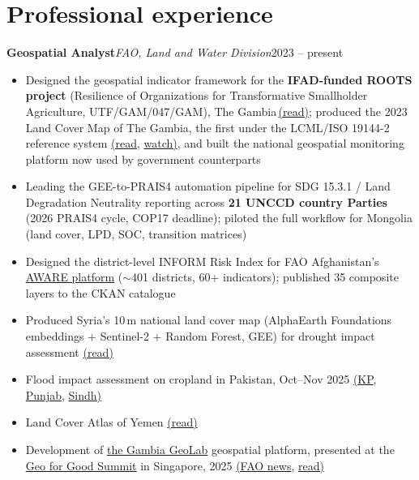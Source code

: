 \documentclass[10pt,a4paper]{article}
\newcommand{\role}[3]{%
  \textbf{#1}\hfill\textcolor{accent}{\textit{#2}}\hfill{#3}\par\vspace{0.15em}}
\begin{document}
\section{Professional experience}

\role{Geospatial Analyst}{FAO, Land and Water Division}{2023 -- present}
\begin{itemize}
\item Designed the geospatial indicator framework for the \textbf{IFAD-funded ROOTS project} (Resilience of Organizations for Transformative Smallholder Agriculture, UTF/GAM/047/GAM), The Gambia\,\href{https://openknowledge.fao.org/items/f3175f42-56ff-4b85-892b-528dd124b73a}{(read)}; produced the 2023 Land Cover Map of The Gambia, the first under the LCML/ISO 19144-2 reference system \href{https://openknowledge.fao.org/items/9bb51030-7521-4c72-97d0-5603c5221049}{(read}, \href{https://www.youtube.com/watch?v=5cydX2MixNs}{watch)}, and built the national geospatial monitoring platform now used by government counterparts
\item Leading the GEE-to-PRAIS4 automation pipeline for SDG 15.3.1 / Land Degradation Neutrality reporting across \textbf{21 UNCCD country Parties} (2026 PRAIS4 cycle, COP17 deadline); piloted the full workflow for Mongolia (land cover, LPD, SOC, transition matrices)
\item Designed the district-level INFORM Risk Index for FAO Afghanistan's \href{https://data.apps.fao.org/aware}{AWARE platform} ($\sim$401 districts, 60+ indicators); published 35 composite layers to the CKAN catalogue
\item Produced Syria's 10\,m national land cover map (AlphaEarth Foundations embeddings + Sentinel-2 + Random Forest, GEE) for drought impact assessment \href{https://openknowledge.fao.org/handle/20.500.14283/ce0956en}{(read)}
\item Flood impact assessment on cropland in Pakistan, Oct--Nov 2025 \href{https://openknowledge.fao.org/items/32a5a117-80f8-4038-acd9-040ae5e53a61}{(KP}, \href{https://openknowledge.fao.org/items/b3340185-2f8f-444b-9795-ea3512f774ca}{Punjab}, \href{https://openknowledge.fao.org/items/fb92c557-615a-4c61-a197-c2ebd92b32f0}{Sindh)}
\item Land Cover Atlas of Yemen \href{https://openknowledge.fao.org/items/3ca05f72-f0b0-4ccb-9567-531fa8d84619}{(read)}
\item Development of \href{http://34.78.39.234:8082/}{the Gambia GeoLab} geospatial platform, presented at the \href{https://earthoutreachonair.withgoogle.com/events/geoforgood25-singapore}{Geo for Good Summit} in Singapore, 2025 \href{https://www.fao.org/geospatial/news/news-detail/fao-presents-the-gambia-geolab-at-geo-for-good-summit-in-singapore/en}{(FAO news}, \href{https://medium.com/@gi.baldassarre/turning-research-and-data-into-actionable-insights-for-agriculture-and-natural-resource-management-b2d035aa96a8}{read)}

\end{itemize}
\end{document}

